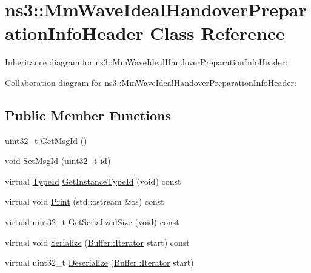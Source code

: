 \hypertarget{classns3_1_1MmWaveIdealHandoverPreparationInfoHeader}{}\section{ns3\+:\+:Mm\+Wave\+Ideal\+Handover\+Preparation\+Info\+Header Class Reference}
\label{classns3_1_1MmWaveIdealHandoverPreparationInfoHeader}


Inheritance diagram for ns3\+:\+:Mm\+Wave\+Ideal\+Handover\+Preparation\+Info\+Header\+:


Collaboration diagram for ns3\+:\+:Mm\+Wave\+Ideal\+Handover\+Preparation\+Info\+Header\+:
\subsection*{Public Member Functions}
\begin{DoxyCompactItemize}
\item 
uint32\+\_\+t \hyperlink{classns3_1_1MmWaveIdealHandoverPreparationInfoHeader_aad82731eb96d53ceec0f480cf9fadf47}{Get\+Msg\+Id} ()
\item 
void \hyperlink{classns3_1_1MmWaveIdealHandoverPreparationInfoHeader_a1b18c187b016aaee5bfd52e95620e825}{Set\+Msg\+Id} (uint32\+\_\+t id)
\item 
virtual \hyperlink{classns3_1_1TypeId}{Type\+Id} \hyperlink{classns3_1_1MmWaveIdealHandoverPreparationInfoHeader_a873ef2dc17db70f472ddcec2c7509342}{Get\+Instance\+Type\+Id} (void) const 
\item 
virtual void \hyperlink{classns3_1_1MmWaveIdealHandoverPreparationInfoHeader_ac0d98a8344b52c2b462c587e5b05697f}{Print} (std\+::ostream \&os) const 
\item 
virtual uint32\+\_\+t \hyperlink{classns3_1_1MmWaveIdealHandoverPreparationInfoHeader_aa259110cef49880dff4ce5cd7d3be969}{Get\+Serialized\+Size} (void) const 
\item 
virtual void \hyperlink{classns3_1_1MmWaveIdealHandoverPreparationInfoHeader_a30e7d1598864daaacfd340f259a3ab2c}{Serialize} (\hyperlink{classns3_1_1Buffer_1_1Iterator}{Buffer\+::\+Iterator} start) const 
\item 
virtual uint32\+\_\+t \hyperlink{classns3_1_1MmWaveIdealHandoverPreparationInfoHeader_ae10b8706c3baaec02d71d5d5823afb8f}{Deserialize} (\hyperlink{classns3_1_1Buffer_1_1Iterator}{Buffer\+::\+Iterator} start)
\end{DoxyCompactItemize}
